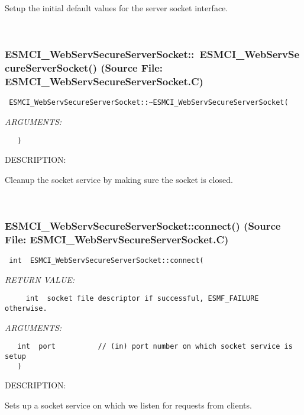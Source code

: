       Setup the initial default values for the server socket interface.
   
 
\mbox{}\hrulefill\
 
\subsubsection{ESMCI\_WebServSecureServerSocket::~ESMCI\_WebServSecureServerSocket() (Source File: ESMCI\_WebServSecureServerSocket.C)}


  
\begin{verbatim} ESMCI_WebServSecureServerSocket::~ESMCI_WebServSecureServerSocket(\end{verbatim}{\em ARGUMENTS:}
\begin{verbatim}   )\end{verbatim}
{\sf DESCRIPTION:\\ }


      Cleanup the socket service by making sure the socket is closed.
   
 
\mbox{}\hrulefill\
 
\subsubsection{ESMCI\_WebServSecureServerSocket::connect() (Source File: ESMCI\_WebServSecureServerSocket.C)}


  
\begin{verbatim} int  ESMCI_WebServSecureServerSocket::connect(\end{verbatim}{\em RETURN VALUE:}
\begin{verbatim}     int  socket file descriptor if successful, ESMF_FAILURE otherwise.\end{verbatim}{\em ARGUMENTS:}
\begin{verbatim}   int  port          // (in) port number on which socket service is setup
   )\end{verbatim}
{\sf DESCRIPTION:\\ }


      Sets up a socket service on which we listen for requests from clients.
  
\setlength{\parskip}{\oldparskip}
\setlength{\parindent}{\oldparindent}
\setlength{\baselineskip}{\oldbaselineskip}
